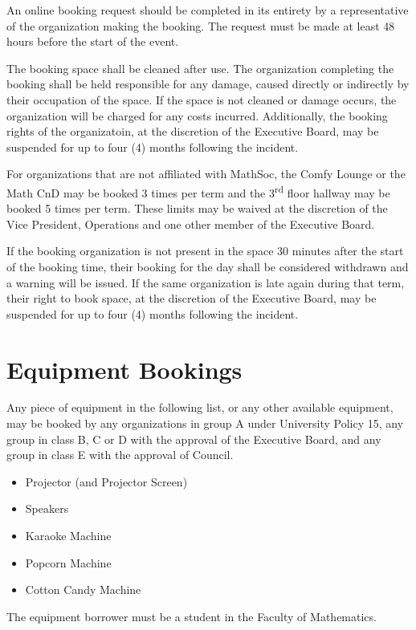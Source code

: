 An online booking request should be completed in its entirety by a
representative of the organization making the booking. The request must be made
at least 48 hours before the start of the event.

The booking space shall be cleaned after use. The organization completing the
booking shall be held responsible for any damage, caused directly or indirectly
by their occupation of the space. If the space is not cleaned or damage occurs,
the organization will be charged for any costs incurred. Additionally, the
booking rights of the organizatoin, at the discretion of the Executive Board,
may be suspended for up to four (4) months following the incident.

For organizations that are not affiliated with MathSoc, the Comfy Lounge or the
Math CnD may be booked 3 times per term and the 3\textsuperscript{rd} floor
hallway may be booked 5 times per term. These limits may be waived at the
discretion of the Vice President, Operations and one other member of the
Executive Board.

If the booking organization is not present in the space 30 minutes after the
start of the booking time, their booking for the day shall be considered
withdrawn and a warning will be issued. If the same organization is late again
during that term, their right to book space, at the discretion of the Executive
Board, may be suspended for up to four (4) months following the incident.

\section{Equipment Bookings}

Any piece of equipment in the following list, or any other available equipment,
may be booked by any organizations in group A under University Policy 15, any
group in class B, C or D with the approval of the Executive Board, and any group
in class E with the approval of Council.

\begin{itemize}
  \item Projector (and Projector Screen)
  \item Speakers
  \item Karaoke Machine
  \item Popcorn Machine
  \item Cotton Candy Machine
\end{itemize}

The equipment borrower must be a student in the Faculty of Mathematics.

